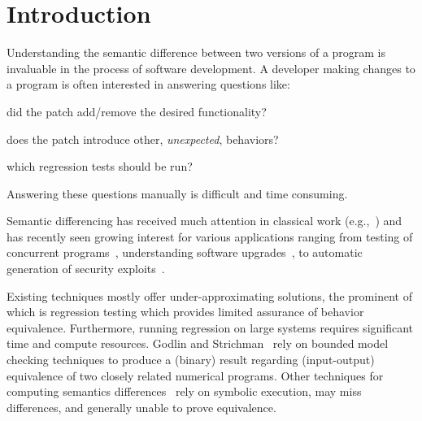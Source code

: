 \section{Introduction} 



Understanding the semantic difference between two versions of a program is invaluable in the process of software development. A developer making changes to a program is often interested in answering questions like:
\begin{inparaenum}[(i)]
\item did the patch add/remove the desired functionality?
\item does the patch introduce other, \emph{unexpected}, behaviors?
\item which regression tests should be run?
\end{inparaenum}
Answering these questions manually is difficult and time consuming.

Semantic differencing has received much attention in classical work (e.g.,~\cite{Horwitz90,Horwitz89}) and has recently seen growing interest for various applications ranging from testing of concurrent programs~\cite{ChakiGurfinkelStrichman12}, understanding software upgrades~\cite{JinOrsoXie10}, to automatic generation of security exploits~\cite{BrumleyPoosankamSongZheng08}.

Existing techniques mostly offer under-approximating solutions, the prominent of which is regression testing which provides limited assurance of behavior equivalence. Furthermore, running regression on large systems requires significant time and compute resources. Godlin and Strichman~\cite{GodlinStrichman09} rely on bounded model checking techniques to produce a (binary) result regarding (input-output) equivalence of two closely related numerical programs.  Other techniques for computing semantics differences~\cite{DwyerElbaumPerson08,EnglerRamos11} rely on
symbolic execution, may miss differences, and generally unable to prove equivalence.

